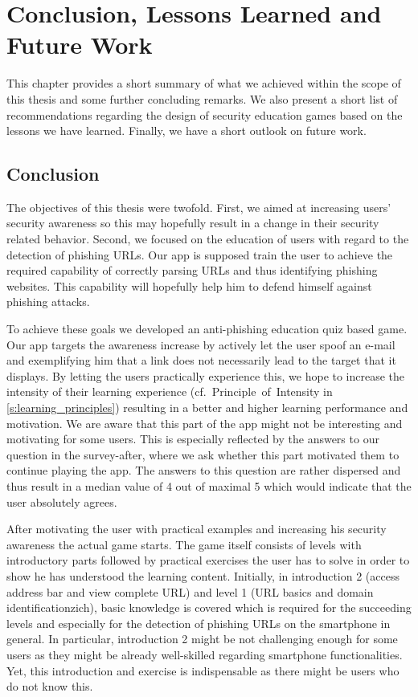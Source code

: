 
\section{Conclusion, Lessons Learned and Future Work}
\label{s:conclusion}

This chapter provides a short summary of what we achieved within the scope of this thesis and some further concluding remarks.
We also present a short list of recommendations regarding the design of security education games based on the lessons we have learned.
Finally, we have a short outlook on future work.
\subsection{Conclusion}
The objectives of this thesis were twofold.
First, we aimed at increasing users' security awareness so this may hopefully result in a change in their security related behavior.
Second, we focused on the education of users with regard to the detection of phishing URLs. 
Our app is supposed train the user to achieve the required capability of correctly parsing URLs and thus identifying phishing websites.
This capability will hopefully help him to defend himself against phishing attacks.

To achieve these goals we developed an anti-phishing education quiz based game.
Our app targets the awareness increase by actively let the user spoof an e-mail and exemplifying him that a link does not necessarily lead to the target that it displays.
By letting the users practically experience this, we hope to increase the intensity of their learning experience (cf.~Principle~of~Intensity in \autoref{s:learning_principles}) resulting in a better and higher learning performance and motivation. We are aware that this part of the app might not be interesting and motivating for some users.
This is especially reflected by the answers to our question in the survey-after, where we ask whether this part motivated them to continue playing the app. 
The answers to this question are rather dispersed and thus result in a median value of 4 out of maximal 5 which would indicate that the user absolutely agrees.

After motivating the user with practical examples and increasing his security awareness the actual game starts.
The game itself consists of levels with introductory parts followed by practical exercises the user has to solve in order to show he has understood the learning content.
Initially, in introduction 2 (access address bar and view complete URL) and level 1 (URL basics and domain identificationzich), basic knowledge is covered which is required for the succeeding levels and especially for the detection of phishing URLs on the smartphone in general.
In particular, introduction 2 might be not challenging enough for some users as they might be already well-skilled regarding smartphone functionalities.
Yet, this introduction and exercise is indispensable as there might be users who do not know this.

